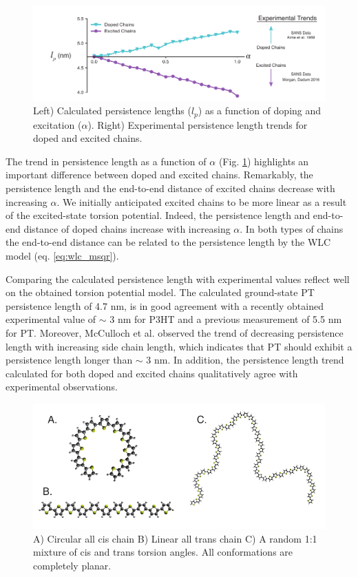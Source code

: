 \begin{figure}[hbt!]
    \centering
    \includegraphics{figures/chap2/persist_len.pdf}
    \caption{Left) Calculated persistence lengths ($l_p$) as a function of doping and excitation ($\alpha$). Right) Experimental persistence length trends for doped and excited chains.}
    \label{fig:lp}
\end{figure}

The trend in persistence length as a function of $\alpha$ (Fig. \ref{fig:lp}) highlights an important difference between doped and excited chains. Remarkably, the persistence length and the end-to-end distance of excited chains decrease with increasing $\alpha$. We initially anticipated excited chains to be more linear as a result of the excited-state torsion potential. Indeed, the persistence length and end-to-end distance of doped chains increase with increasing $\alpha$. In both types of chains the end-to-end distance can be related to the persistence length by the WLC model (eq. \ref{eq:wlc_msqr}).

Comparing the calculated persistence length with experimental values reflect well on the obtained torsion potential model. The calculated ground-state PT persistence length of 4.7 nm, is in good agreement with a recently obtained experimental value of $\sim$ 3 nm for P3HT\cite{Mcculloch2013} and a previous measurement of 5.5 nm for PT.\cite{Aime1989} Moreover, McCulloch et al. observed the trend of decreasing persistence length with increasing side chain length, which indicates that PT should exhibit a persistence length longer than $\sim$ 3 nm. In addition, the persistence length trend calculated for both doped and excited chains qualitatively agree with experimental observations.

\begin{figure}[hbt!]
    \centering
    \includegraphics{figures/chap2/planar_chains.pdf}
    \caption{A) Circular all cis chain B) Linear all trans chain C) A random 1:1 mixture of cis and trans torsion angles. All conformations are completely planar.}
    \label{fig:ideal}
\end{figure}

